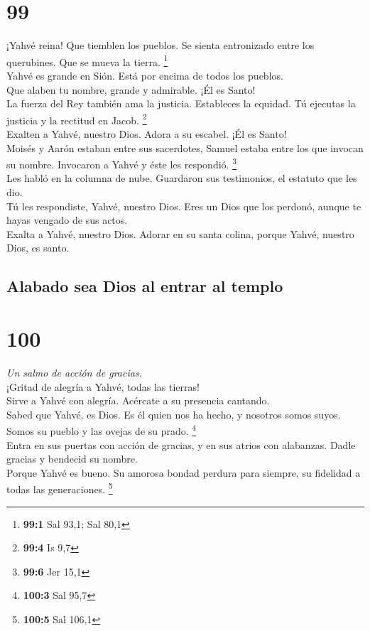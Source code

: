 \hypertarget{section-96}{%
\section{99}\label{section-96}}

 ¡Yahvé reina! Que tiemblen los pueblos. Se sienta
entronizado entre los querubines. Que se mueva la tierra. \footnote{\textbf{99:1}
  Sal 93,1; Sal 80,1}\\
 Yahvé es grande en Sión. Está por encima de todos los
pueblos.\\
 Que alaben tu nombre, grande y admirable. ¡Él es Santo!\\
 La fuerza del Rey también ama la justicia. Estableces la
equidad. Tú ejecutas la justicia y la rectitud en Jacob. \footnote{\textbf{99:4}
  Is 9,7}\\
 Exalten a Yahvé, nuestro Dios. Adora a su escabel. ¡Él es
Santo!\\
 Moisés y Aarón estaban entre sus sacerdotes, Samuel
estaba entre los que invocan su nombre. Invocaron a Yahvé y éste les
respondió. \footnote{\textbf{99:6} Jer 15,1}\\
 Les habló en la columna de nube. Guardaron sus
testimonios, el estatuto que les dio.\\
 Tú les respondiste, Yahvé, nuestro Dios. Eres un Dios que
los perdonó, aunque te hayas vengado de sus actos.\\
 Exalta a Yahvé, nuestro Dios. Adorar en su santa colina,
porque Yahvé, nuestro Dios, es santo.

\hypertarget{alabado-sea-dios-al-entrar-al-templo}{%
\subsection{Alabado sea Dios al entrar al
templo}\label{alabado-sea-dios-al-entrar-al-templo}}

\hypertarget{section-97}{%
\section{100}\label{section-97}}

\emph{Un salmo de acción de gracias.}\\
 ¡Gritad de alegría a Yahvé, todas las tierras!\\
 Sirve a Yahvé con alegría. Acércate a su presencia
cantando.\\
 Sabed que Yahvé, es Dios. Es él quien nos ha hecho, y
nosotros somos suyos. Somos su pueblo y las ovejas de su prado.
\footnote{\textbf{100:3} Sal 95,7}\\
 Entra en sus puertas con acción de gracias, y en sus
atrios con alabanzas. Dadle gracias y bendecid su nombre.\\
 Porque Yahvé es bueno. Su amorosa bondad perdura para
siempre, su fidelidad a todas las generaciones. \footnote{\textbf{100:5}
  Sal 106,1}

